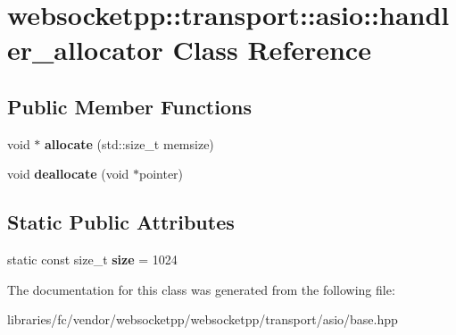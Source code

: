 \hypertarget{classwebsocketpp_1_1transport_1_1asio_1_1handler__allocator}{}\section{websocketpp\+:\+:transport\+:\+:asio\+:\+:handler\+\_\+allocator Class Reference}
\label{classwebsocketpp_1_1transport_1_1asio_1_1handler__allocator}
\subsection*{Public Member Functions}
\begin{DoxyCompactItemize}
\item 
\mbox{\label{classwebsocketpp_1_1transport_1_1asio_1_1handler__allocator_a526b360a715196645ce1da14c59ae6c7}} 
void $\ast$ {\bfseries allocate} (std\+::size\+\_\+t memsize)
\item 
\mbox{\label{classwebsocketpp_1_1transport_1_1asio_1_1handler__allocator_a8ba1b99267d13036f866f1e10d925efc}} 
void {\bfseries deallocate} (void $\ast$pointer)
\end{DoxyCompactItemize}
\subsection*{Static Public Attributes}
\begin{DoxyCompactItemize}
\item 
\mbox{\label{classwebsocketpp_1_1transport_1_1asio_1_1handler__allocator_aea8d0b7af2997fc2e84e95e459c16ccb}} 
static const size\+\_\+t {\bfseries size} = 1024
\end{DoxyCompactItemize}


The documentation for this class was generated from the following file\+:\begin{DoxyCompactItemize}
\item 
libraries/fc/vendor/websocketpp/websocketpp/transport/asio/base.\+hpp\end{DoxyCompactItemize}
